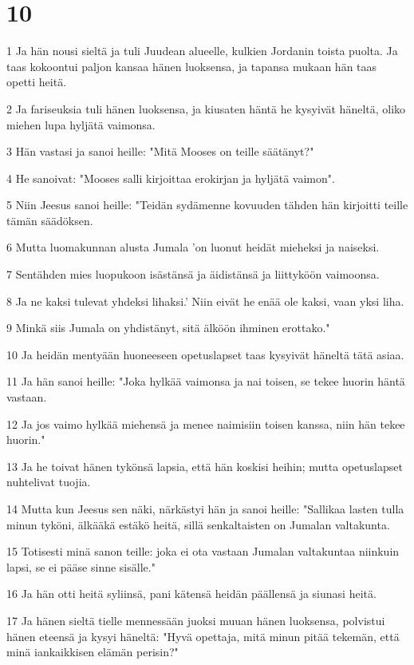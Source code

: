 \chapter{10}

\par 1 Ja hän nousi sieltä ja tuli Juudean alueelle, kulkien Jordanin toista puolta. Ja taas kokoontui paljon kansaa hänen luoksensa, ja tapansa mukaan hän taas opetti heitä.
\par 2 Ja fariseuksia tuli hänen luoksensa, ja kiusaten häntä he kysyivät häneltä, oliko miehen lupa hyljätä vaimonsa.
\par 3 Hän vastasi ja sanoi heille: "Mitä Mooses on teille säätänyt?"
\par 4 He sanoivat: "Mooses salli kirjoittaa erokirjan ja hyljätä vaimon".
\par 5 Niin Jeesus sanoi heille: "Teidän sydämenne kovuuden tähden hän kirjoitti teille tämän säädöksen.
\par 6 Mutta luomakunnan alusta Jumala 'on luonut heidät mieheksi ja naiseksi.
\par 7 Sentähden mies luopukoon isästänsä ja äidistänsä ja liittyköön vaimoonsa.
\par 8 Ja ne kaksi tulevat yhdeksi lihaksi.' Niin eivät he enää ole kaksi, vaan yksi liha.
\par 9 Minkä siis Jumala on yhdistänyt, sitä älköön ihminen erottako."
\par 10 Ja heidän mentyään huoneeseen opetuslapset taas kysyivät häneltä tätä asiaa.
\par 11 Ja hän sanoi heille: "Joka hylkää vaimonsa ja nai toisen, se tekee huorin häntä vastaan.
\par 12 Ja jos vaimo hylkää miehensä ja menee naimisiin toisen kanssa, niin hän tekee huorin."
\par 13 Ja he toivat hänen tykönsä lapsia, että hän koskisi heihin; mutta opetuslapset nuhtelivat tuojia.
\par 14 Mutta kun Jeesus sen näki, närkästyi hän ja sanoi heille: "Sallikaa lasten tulla minun tyköni, älkääkä estäkö heitä, sillä senkaltaisten on Jumalan valtakunta.
\par 15 Totisesti minä sanon teille: joka ei ota vastaan Jumalan valtakuntaa niinkuin lapsi, se ei pääse sinne sisälle."
\par 16 Ja hän otti heitä syliinsä, pani kätensä heidän päällensä ja siunasi heitä.
\par 17 Ja hänen sieltä tielle mennessään juoksi muuan hänen luoksensa, polvistui hänen eteensä ja kysyi häneltä: "Hyvä opettaja, mitä minun pitää tekemän, että minä iankaikkisen elämän perisin?"
